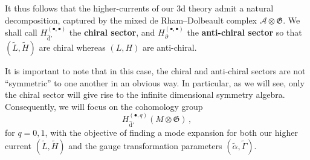 \documentclass[11pt]{amsart}
\newcommand{\dr}{{\mathrm{d}}}
\newcommand{\CA}{{\mathcal A}}
\newcommand{\CW}{{\mathcal W}}
\numberwithin{equation}{section}
\numberwithin{figure}{section}
\numberwithin{table}{section}
\theoremstyle{thm}
\numberwithin{equation}{subsection}
\theoremstyle{definition}
\theoremstyle{rem}
\newcommand{\HC}[1]{\textcolor{red}{HC: #1}}
\begin{document}
It thus follows that the higher-currents of our 3d theory admit a natural decomposition, captured by the mixed de Rham--Dolbeault complex \(\mathcal{A} \otimes \mathfrak{G}\).  We shall call $H_{\hat \dr'}^{(\bullet,\bullet)}$ the \textbf{chiral sector}, and $H_{\partial}^{(\bullet,\bullet)}$ the \textbf{anti-chiral sector} so that $(\tilde L,\tilde H)$ are chiral  whereas $(L,H)$ are anti-chiral. 


It is important to note that in this case, the chiral and anti-chiral sectors are not ``symmetric'' to one another in an obvious way. In particular, as we will see, only the chiral sector will give rise to the infinite dimensional symmetry algebra. Consequently, we will focus on the cohomology group
\begin{equation}
    H_{\hat{\mathrm{d}}'}^{(\bullet,q)}(M \otimes \mathfrak{G})\,,
\end{equation}
for $q=0,1$, with the objective of finding a mode expansion for both our higher current $(\tilde L, \tilde H)$ and the gauge transformation parameters $(\tilde \alpha,\tilde \Gamma)$. 


\end{document}
